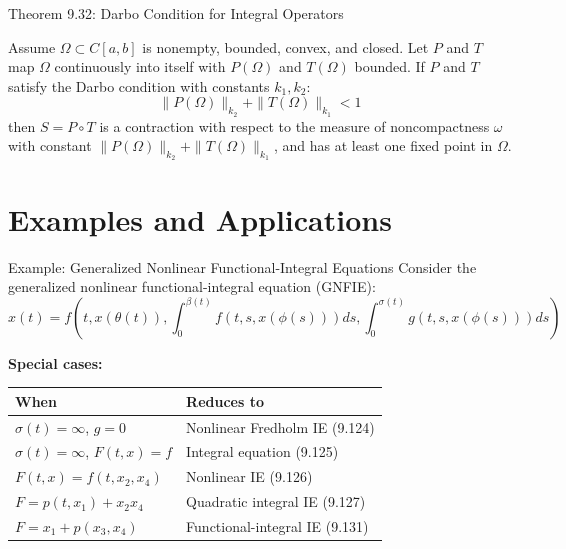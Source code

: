 \documentclass[aspectratio=169,10pt]{beamer}
\begin{document}
\begin{frame}[fragile]{Theorem 9.32: Darbo Condition for Integral Operators}
\begin{theorem}
Assume $\Omega \subset C[a,b]$ is nonempty, bounded, convex, and closed. Let $P$ and $T$
map $\Omega$ continuously into itself with $P(\Omega)$ and $T(\Omega)$ bounded.
If $P$ and $T$ satisfy the Darbo condition with constants $k_1, k_2$:
\[
\|P(\Omega)\|_k_2 + \|T(\Omega)\|_{k_1} < 1
\]
then $S = P \circ T$ is a contraction with respect to the measure of noncompactness
$\omega$ with constant $\|P(\Omega)\|_{k_2} + \|T(\Omega)\|_{k_1}$,
and has at least one fixed point in $\Omega$.
\end{theorem}

\vspace{1em}
\end{frame}

\section{Examples and Applications}

\begin{frame}[fragile]{Example: Generalized Nonlinear Functional-Integral Equations}
Consider the generalized nonlinear functional-integral equation (GNFIE):
\[
x(t) = f\left(t,x(\theta(t)), \int_0^{\beta(t)} f(t,s,x(\phi(s)))ds,
        \int_0^{\sigma(t)} g(t,s,x(\phi(s)))ds\right)
\]

\vspace{1em}
\textbf{Special cases:}

\begin{tabular}{|l|l|}
\hline
\textbf{When} & \textbf{Reduces to} \\
\hline
$\sigma(t) = \infty$, $g = 0$ & Nonlinear Fredholm IE (9.124) \\
$\sigma(t) = \infty$, $F(t,x) = f$ & Integral equation (9.125) \\
$F(t,x) = f(t,x_2, x_4)$ & Nonlinear IE (9.126) \\
$F = p(t,x_1) + x_2 x_4$ & Quadratic integral IE (9.127) \\
$F = x_1 + p(x_3,x_4)$ & Functional-integral IE (9.131) \\
\hline
\end{tabular}

\vspace{1em}
\end{frame}
\end{document}

